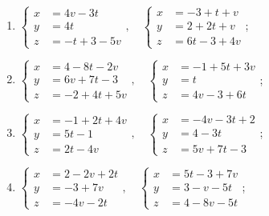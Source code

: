 \begin{enumerate}
			\item \( \left\lbrace \begin{aligned}
						x &= 4v-3t \\
						y &= 4t \\
						z &= -t+3-5v
					\end{aligned} \right., \quad \left\lbrace \begin{aligned}
						x &= -3+t+v \\
						y &= 2+2t+v \\
						z &= 6t-3+4v
					\end{aligned} \right. \);
			\item \( \left\lbrace \begin{aligned}
						x &= 4-8t-2v \\
						y &= 6v+7t-3 \\
						z &= -2+4t+5v
					\end{aligned} \right., \quad \left\lbrace \begin{aligned}
						x &= -1+5t+3v \\
						y &= t \\
						z &= 4v-3+6t
					\end{aligned} \right. \);
			\item \( \left\lbrace \begin{aligned}
						x &= -1+2t+4v \\
						y &= 5t-1 \\
						z &= 2t-4v
					\end{aligned} \right., \quad \left\lbrace \begin{aligned}
						x &= -4v-3t+2 \\
						y &= 4-3t \\
						z &= 5v+7t-3
					\end{aligned} \right. \);
			\item \( \left\lbrace \begin{aligned}
						x &= 2-2v+2t \\
						y &= -3+7v \\
						z &= -4v-2t
					\end{aligned} \right., \quad \left\lbrace \begin{aligned}
						x &= 5t-3+7v \\
						y &= 3-v-5t \\
						z &= 4-8v-5t
					\end{aligned} \right. \);

		\setcounter{tasks}{\value{enumi}}
	\end{enumerate}

